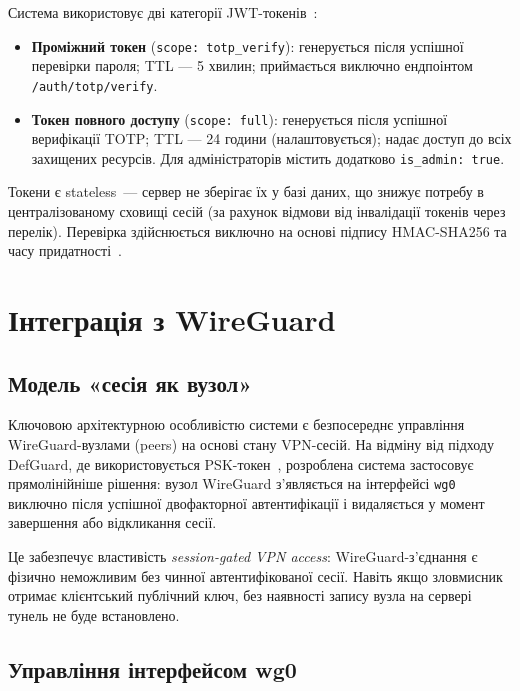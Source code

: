 Система використовує дві категорії JWT-токенів~\cite{rfc7519}:

\begin{itemize}
  \item \textbf{Проміжний токен} (\texttt{scope: totp\_verify}):
    генерується після успішної перевірки пароля; TTL — 5 хвилин;
    приймається виключно ендпоінтом \texttt{/auth/totp/verify}.

  \item \textbf{Токен повного доступу} (\texttt{scope: full}):
    генерується після успішної верифікації TOTP; TTL — 24 години
    (налаштовується); надає доступ до всіх захищених ресурсів.
    Для адміністраторів містить додатково \texttt{is\_admin: true}.
\end{itemize}

Токени є stateless~--- сервер не зберігає їх у базі даних, що знижує
потребу в централізованому сховищі сесій (за рахунок відмови від
інвалідації токенів через перелік). Перевірка
здійснюється виключно на основі підпису HMAC-SHA256 та часу
придатності~\cite{rfc7519}.

\section{Інтеграція з WireGuard}
\label{sec:wireguard_integration}

\subsection{Модель «сесія як вузол»}

Ключовою архітектурною особливістю системи є безпосереднє управління
WireGuard-вузлами (peers) на основі стану VPN-сесій. На відміну від
підходу DefGuard, де використовується PSK-токен~\cite{defguard2024},
розроблена система застосовує прямолінійніше рішення: вузол WireGuard
з'являється на інтерфейсі \texttt{wg0} виключно після успішної
двофакторної автентифікації і видаляється у момент завершення або
відкликання сесії.

Це забезпечує властивість \textit{session-gated VPN access}:
WireGuard-з'єднання є фізично неможливим без чинної автентифікованої
сесії. Навіть якщо зловмисник отримає клієнтський публічний ключ, без
наявності запису вузла на сервері тунель не буде встановлено.

\subsection{Управління інтерфейсом wg0}

